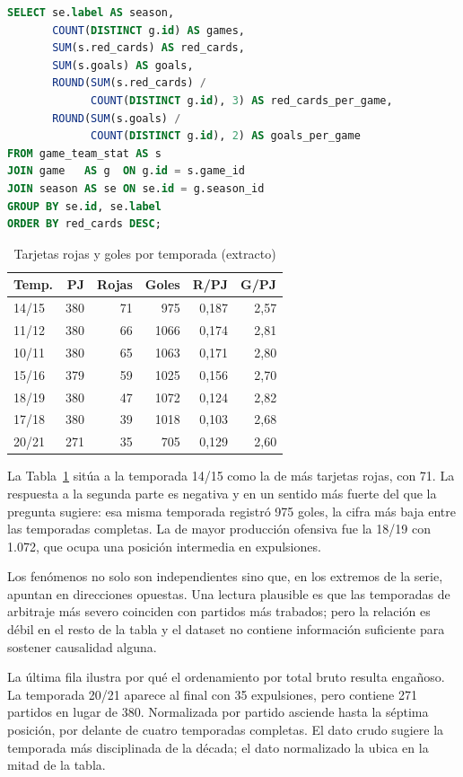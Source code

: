 \documentclass[conference]{IEEEtran}
\begin{document}
\begin{lstlisting}[language=SQL]
SELECT se.label AS season,
       COUNT(DISTINCT g.id) AS games,
       SUM(s.red_cards) AS red_cards,
       SUM(s.goals) AS goals,
       ROUND(SUM(s.red_cards) /
             COUNT(DISTINCT g.id), 3) AS red_cards_per_game,
       ROUND(SUM(s.goals) /
             COUNT(DISTINCT g.id), 2) AS goals_per_game
FROM game_team_stat AS s
JOIN game   AS g  ON g.id = s.game_id
JOIN season AS se ON se.id = g.season_id
GROUP BY se.id, se.label
ORDER BY red_cards DESC;
\end{lstlisting}

\begin{table}[htbp]
\caption{Tarjetas rojas y goles por temporada (extracto)}
\label{tab:rojas}
\centering
\begin{tabular}{lrrrrr}
\toprule
\textbf{Temp.} & \textbf{PJ} & \textbf{Rojas} & \textbf{Goles} &
\textbf{R/PJ} & \textbf{G/PJ} \\
\midrule
14/15 & 380 & 71 & 975  & 0,187 & 2,57 \\
11/12 & 380 & 66 & 1066 & 0,174 & 2,81 \\
10/11 & 380 & 65 & 1063 & 0,171 & 2,80 \\
15/16 & 379 & 59 & 1025 & 0,156 & 2,70 \\
18/19 & 380 & 47 & 1072 & 0,124 & 2,82 \\
17/18 & 380 & 39 & 1018 & 0,103 & 2,68 \\
20/21 & 271 & 35 & 705  & 0,129 & 2,60 \\
\bottomrule
\end{tabular}
\end{table}

La Tabla~\ref{tab:rojas} sitúa a la temporada 14/15 como la de más tarjetas
rojas, con 71. La respuesta a la segunda parte es negativa y en un sentido más
fuerte del que la pregunta sugiere: esa misma temporada registró 975 goles, la
cifra más baja entre las temporadas completas. La de mayor producción ofensiva
fue la 18/19 con 1.072, que ocupa una posición intermedia en expulsiones.

Los fenómenos no solo son independientes sino que, en los extremos de la serie,
apuntan en direcciones opuestas. Una lectura plausible es que las temporadas de
arbitraje más severo coinciden con partidos más trabados; pero la relación es
débil en el resto de la tabla y el dataset no contiene información suficiente
para sostener causalidad alguna.

La última fila ilustra por qué el ordenamiento por total bruto resulta
engañoso. La temporada 20/21 aparece al final con 35 expulsiones, pero contiene
271 partidos en lugar de 380. Normalizada por partido asciende hasta la séptima
posición, por delante de cuatro temporadas completas. El dato crudo sugiere la
temporada más disciplinada de la década; el dato normalizado la ubica en la
mitad de la tabla.
\end{document}
